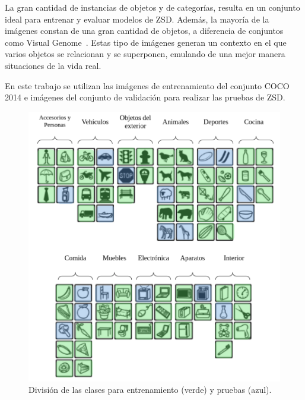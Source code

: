 La gran cantidad de instancias de objetos y de categorías, resulta en un conjunto ideal para entrenar y evaluar modelos de ZSD. Además, la mayoría de la imágenes constan de una gran cantidad de objetos, a diferencia de conjuntos como Visual Genome~\cite{krishnavisualgenome}. Estas tipo de imágenes generan un contexto en el que varios objetos se relacionan y se superponen, emulando de una mejor manera situaciones de la vida real. 

En este trabajo se utilizan las imágenes de entrenamiento del conjunto COCO 2014 e imágenes del conjunto de validación para realizar las pruebas de ZSD.

\begin{figure}
	\begin{center}
		\centering
		\includegraphics[width=1\textwidth]{img/data_set.png}
		\caption{División de las clases para entrenamiento (verde) y pruebas (azul).}
		\label{fig:data_set}
	\end{center}	
\end{figure}

